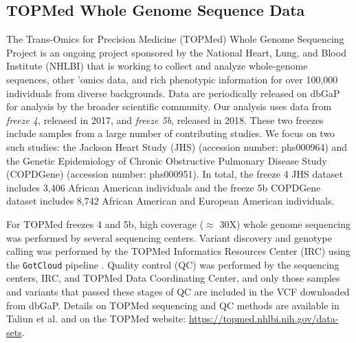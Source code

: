 \documentclass[12pt]{article}
\begin{document}


\subsection{TOPMed Whole Genome Sequence Data}

The Trans-Omics for Precision Medicine (TOPMed) Whole Genome Sequencing Project is an ongoing project sponsored by the National Heart, Lung, and Blood Institute (NHLBI) that is working to collect and analyze whole-genome sequences, other 'omics data, and rich phenotypic information for over 100,000 individuals from diverse backgrounds. 
Data are periodically released on dbGaP for analysis by the broader scientific community. 
Our analysis uses data from \textit{freeze 4}, released in 2017, and \textit{freeze 5b}, released in 2018.
These two freezes include samples from a large number of contributing studies.
We focus on two such studies: the Jackson Heart Study (JHS) (accession number: phs000964) and the Genetic Epidemiology of Chronic Obstructive Pulmonary Disease Study (COPDGene) (accession number: phs000951).
In total, the freeze 4 JHS dataset includes 3,406 African American individuals and the freeze 5b COPDGene dataset includes 8,742 African American and European American individuals.

For TOPMed freezes 4 and 5b, high coverage ($\approx$ 30X) whole genome sequencing was performed by several sequencing centers.
Variant discovery and genotype calling was performed by the TOPMed Informatics Resources Center (IRC) using the \texttt{GotCloud} pipeline \citep{jun2015}.
Quality control (QC) was performed by the sequencing centers, IRC, and TOPMed Data Coordinating Center, and only those samples and variants that passed these stages of QC are included in the VCF downloaded from dbGaP.
Details on TOPMed sequencing and QC methods are available in Taliun et al. \citep{taliun2021} and on the TOPMed website: \href{https://topmed.nhlbi.nih.gov/data-sets}{https://topmed.nhlbi.nih.gov/data-sets}.
\end{document}
